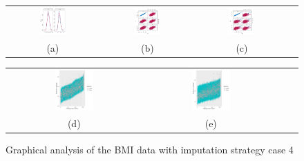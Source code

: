 	
	\begin{figure} [ht!]
		\centering
		\begin{tabular}{cccc}
			\includegraphics[width=0.3\textwidth]{plots/densitycase4} &
			\includegraphics[width=0.3\textwidth]{plots/scattercase4hm} &
			\includegraphics[width=0.3\textwidth]{plots/scattercase4wm} \\
			\textnormal{(a)}  & \textnormal{(b)} & \textnormal{(c)}  \\[6pt]
		\end{tabular}
		\begin{tabular}{cccc}
			\includegraphics[width=0.3\textwidth]{plots/distributioncase4hm} &
			\includegraphics[width=0.3\textwidth]{plots/distributioncase4wm} \\
			\textnormal{(d)}  & \textnormal{(e)}  \\[6pt]
		\end{tabular}
		\caption{Graphical analysis of the BMI data with imputation strategy case 4}
		\label{fig6_12}
	\end{figure}
	
	
	
	
